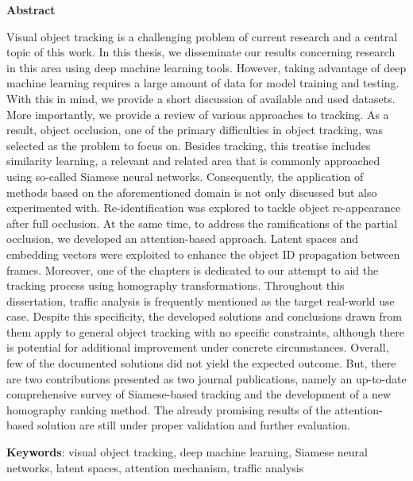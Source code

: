 \thispagestyle{plain}

\begin{center}
    \Large{\textbf{Abstract}}
\end{center}

\noindent Visual object tracking is a challenging problem of current research and a central topic of this work. In this thesis, we disseminate our results concerning research in this area using deep machine learning tools. However, taking advantage of deep machine learning requires a large amount of data for model training and testing. With this in mind, we provide a short discussion of available and used datasets. More importantly, we provide a review of various approaches to tracking. As a result, object occlusion, one of the primary difficulties in object tracking, was selected as the problem to focus on. Besides tracking, this treatise includes similarity learning, a relevant and related area that is commonly approached using so-called Siamese neural networks. Consequently, the application of methods based on the aforementioned domain is not only discussed but also experimented with. Re-identification was explored to tackle object re-appearance after full occlusion. At the same time, to address the ramifications of the partial occlusion, we developed an attention-based approach. Latent spaces and embedding vectors were exploited to enhance the object ID propagation between frames. Moreover, one of the chapters is dedicated to our attempt to aid the tracking process using homography transformations. Throughout this dissertation, traffic analysis is frequently mentioned as the target real-world use case. Despite this specificity, the developed solutions and conclusions drawn from them apply to general object tracking with no specific constraints, although there is potential for additional improvement under concrete circumstances. Overall, few of the documented solutions did not yield the expected outcome. But, there are two contributions presented as two journal publications, namely an up-to-date comprehensive survey of Siamese-based tracking and the development of a new homography ranking method. The already promising results of the attention-based solution are still under proper validation and further evaluation.

\noindent \textbf{Keywords}: visual object tracking, deep machine learning, Siamese neural networks, latent spaces, attention mechanism, traffic analysis
